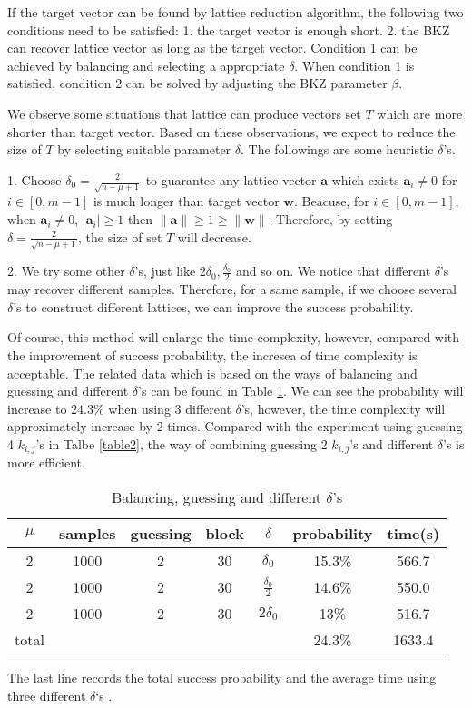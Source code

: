 \documentclass[sigconf]{acmart}
\begin{document}
If the target vector can be found by lattice reduction algorithm, the following two conditions need to be satisfied: 1. the target vector is enough short. 2. the BKZ can recover lattice vector as long as the target vector.  Condition 1 can be achieved by balancing and selecting a appropriate $\delta$. When condition 1 is satisfied, condition 2 can be solved by adjusting the BKZ parameter $\beta$.

We observe some situations that lattice can produce vectors set $T$ which are more shorter than target vector. Based on these observations, we expect to reduce the size of $T$ by selecting suitable parameter $\delta$. The followings are some heuristic $\delta$'s.

1. Choose $\delta_0=\frac{2}{\sqrt{n-\mu+1}}$ to guarantee any lattice vector $\textbf{a}$ which exists $\textbf{a}_i\neq0$ for $i\in[0,m-1]$ is much longer than target vector $\textbf{w}$. Beacuse, for $i\in[0,m-1]$, when $\textbf{a}_i\neq0$, $|\textbf{a}_i|\geq1$ then $\|\textbf{a}\|\geq 1\geq\|\textbf{w}\|$. Therefore, by setting $\delta=\frac{2}{\sqrt{n-\mu+1}}$, the size of set $T$ will decrease.

2. We try some other $\delta$'s, just like $2\delta_0,\frac{\delta_0}{2}$ and so on. We notice that different $\delta$'s may recover different samples. Therefore, for a same sample, if we choose several $\delta$'s to construct different lattices, we can improve the success probability.


Of course, this method will enlarge the time complexity, however, compared with the improvement of success probability, the incresea of time complexity is acceptable. The related data which is based on the ways of balancing and guessing and different $\delta$'s can be found in Table \ref{table3}. We can see the probability will increase to $24.3\%$ when using 3 different $\delta$'s, however, the time complexity will approximately increase by 2 times. Compared with the experiment using guessing 4 $k_{i,j}$'s in Talbe \ref{table2}, the way of combining guessing 2 $k_{i,j}$'s and different $\delta$'s is more efficient.

\begin{table}[!hbp]
\begin{tabular}{|c|c|c|c|c|c|c|}
\hline
$\mu$&samples&guessing&block&$\delta$&probability&time(s)\\
\hline
2&1000&2&30&$\delta_0$&15.3\%&566.7\\
\hline
2&1000&2&30&$\frac{\delta_0}{2}$&14.6\%&550.0\\
\hline
2&1000&2&30&$2\delta_0$&13\%&516.7\\
\hline
total&&&&&24.3\%&1633.4\\
\hline

\end{tabular}
\caption{Balancing, guessing and different $\delta$'s}\label{table3}
The last line records the total success probability and the average time using three different $\delta$‘s .
\end{table}
\end{document}
